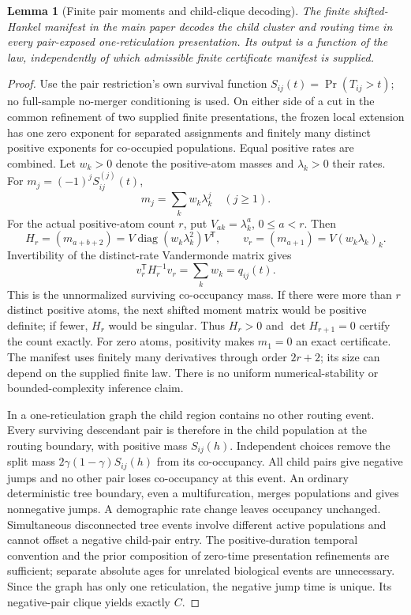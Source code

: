\documentclass[11pt]{article}
\newtheorem{lemma}[theorem]{Lemma}
\begin{document}
\begin{lemma}[Finite pair moments and child-clique decoding]
\label{lem:supp-finite-child-decoder}
The finite shifted-Hankel manifest in the main paper decodes the child cluster and routing time in every pair-exposed one-reticulation presentation.  Its output is a function of the law, independently of which admissible finite certificate manifest is supplied.
\end{lemma}

\begin{proof}
Use the pair restriction's own survival function $S_{ij}(t)=\Pr(T_{ij}>t)$; no full-sample no-merger conditioning is used.  On either side of a cut in the common refinement of two supplied finite presentations, the frozen local extension has one zero exponent for separated assignments and finitely many distinct positive exponents for co-occupied populations.  Equal positive rates are combined.  Let $w_k>0$ denote the positive-atom masses and $\lambda_k>0$ their rates.  For $m_j=(-1)^j S_{ij}^{(j)}(t)$,
\[
m_j=\sum_k w_k\lambda_k^j\quad(j\ge1).
\]
For the actual positive-atom count $r$, put $V_{ak}=\lambda_k^a$, $0\le a<r$.  Then
\[
H_r=(m_{a+b+2})=V\operatorname{diag}(w_k\lambda_k^2)V^{\mathsf T},
\qquad v_r=(m_{a+1})=V(w_k\lambda_k)_k.
\]
Invertibility of the distinct-rate Vandermonde matrix gives
\[
v_r^{\mathsf T}H_r^{-1}v_r=\sum_k w_k=q_{ij}(t).
\]
This is the unnormalized surviving co-occupancy mass.  If there were more than $r$ distinct positive atoms, the next shifted moment matrix would be positive definite; if fewer, $H_r$ would be singular.  Thus $H_r>0$ and $\det H_{r+1}=0$ certify the count exactly.  For zero atoms, positivity makes $m_1=0$ an exact certificate.  The manifest uses finitely many derivatives through order $2r+2$; its size can depend on the supplied finite law.  There is no uniform numerical-stability or bounded-complexity inference claim.

In a one-reticulation graph the child region contains no other routing event.  Every surviving descendant pair is therefore in the child population at the routing boundary, with positive mass $S_{ij}(h)$.  Independent choices remove the split mass $2\gamma(1-\gamma)S_{ij}(h)$ from its co-occupancy.  All child pairs give negative jumps and no other pair loses co-occupancy at this event.  An ordinary deterministic tree boundary, even a multifurcation, merges populations and gives nonnegative jumps.  A demographic rate change leaves occupancy unchanged.  Simultaneous disconnected tree events involve different active populations and cannot offset a negative child-pair entry.  The positive-duration temporal convention and the prior composition of zero-time presentation refinements are sufficient; separate absolute ages for unrelated biological events are unnecessary.  Since the graph has only one reticulation, the negative jump time is unique.  Its negative-pair clique yields exactly $C$.


\end{proof}
\end{document}

